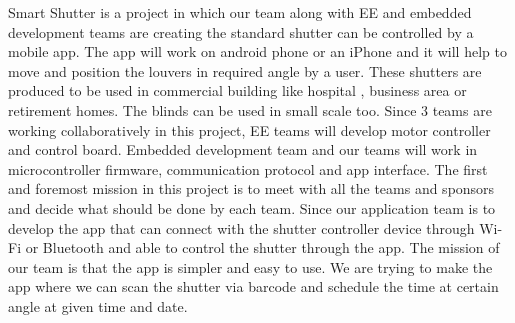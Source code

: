 Smart Shutter is a project in which our team along with EE and embedded development teams are creating the standard shutter can be controlled by a mobile app. The app will work on android phone or an iPhone and it will help to move and position the louvers  in required angle by a user. These shutters are produced to be used in commercial building like hospital , business area or retirement homes. The blinds can be used in small scale too.\newline
Since 3 teams are working collaboratively in this project, EE teams will develop motor controller and control board. Embedded development team and our teams will work in microcontroller firmware, communication protocol and app interface. The first and foremost mission in this project is to meet with all the teams and sponsors and decide what should be done by each team. Since our application team is to develop the app that can connect with the shutter controller device through Wi-Fi or Bluetooth and able to control the shutter through the app. The mission of our team is that the app is simpler and easy to use. We are  trying to make the app where we can scan the shutter via barcode and schedule the time at certain angle at given time and date. 
